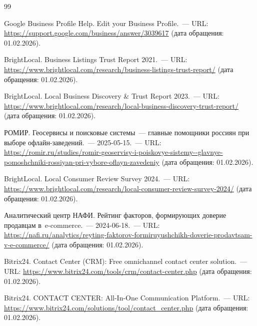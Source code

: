 %

\begin{thebibliography}{99}

Google Business Profile Help. Edit your Business Profile.~--- URL: \url{https://support.google.com/business/answer/3039617} (дата обращения: 01.02.2026).

BrightLocal. Business Listings Trust Report 2021.~--- URL: \url{https://www.brightlocal.com/research/business-listings-trust-report/} (дата обращения: 01.02.2026).

BrightLocal. Local Business Discovery \& Trust Report 2023.~--- URL: \url{https://www.brightlocal.com/research/local-business-discovery-trust-report/} (дата обращения: 01.02.2026).

РОМИР. Геосервисы и поисковые системы~--- главные помощники россиян при выборе офлайн-заведений.~--- 2025-05-15.~--- URL: \url{https://romir.ru/studies/romir-geoservisy-i-poiskovye-sistemy--glavnye-pomoshchniki-rossiyan-pri-vybore-oflayn-zavedeniy} (дата обращения: 01.02.2026).

BrightLocal. Local Consumer Review Survey 2024.~--- URL: \url{https://www.brightlocal.com/research/local-consumer-review-survey-2024/} (дата обращения: 01.02.2026).

Аналитический центр НАФИ. Рейтинг факторов, формирующих доверие продавцам в~e-commerce.~--- 2024-06-18.~--- URL: \url{https://nafi.ru/analytics/reyting-faktorov-formiruyushchikh-doverie-prodavtsam-v-e-commerce/} (дата обращения: 01.02.2026).

Bitrix24. Contact Center (CRM): Free omnichannel contact center solution.~--- URL: \url{https://www.bitrix24.com/tools/crm/contact-center.php} (дата обращения: 01.02.2026).

Bitrix24. CONTACT CENTER: All-In-One Communication Platform.~--- URL: \url{https://www.bitrix24.com/solutions/tool/contact_center.php} (дата обращения: 01.02.2026).


\end{thebibliography}
